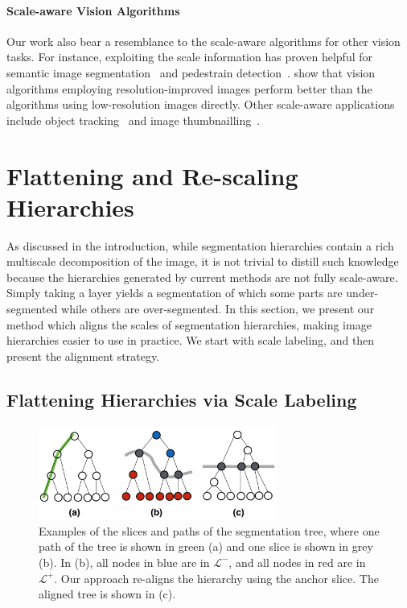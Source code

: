    
\paragraph{Scale-aware Vision Algorithms} 
Our work also bear a resemblance to the scale-aware algorithms for other vision tasks. 
For instance, exploiting the scale information has proven helpful for semantic image segmentation~\citep{chen2015attention, bell15ion} and 
pedestrain detection~\citep{li2015scale}. \citep{SR4VTs:wacv16} show that 
vision algorithms employing resolution-improved images perform better than the algorithms using low-resolution images directly.  
Other scale-aware applications include object tracking~\citep{klodt_etal_2013gcpr} and image thumbnailling~\citep{Sun2013}.     
   
   
   
   
   
\section{Flattening and Re-scaling  Hierarchies}
\label{scale:sec:scaling}
As discussed in the introduction, while segmentation
hierarchies contain a rich multiscale decomposition of the image, it is
not trivial to distill such knowledge because the hierarchies
generated by current methods are not fully scale-aware. Simply taking
a layer yields a segmentation of which some parts are under-segmented
while others are over-segmented. In this section, we present our
method which aligns the scales of segmentation hierarchies, making
image hierarchies easier to use in practice. We start with scale
labeling, and then present the alignment strategy.


\subsection{Flattening Hierarchies via Scale Labeling}
\label{scale:sec:scale:labeling}


\begin{figure}
\begin{center}
\includegraphics[width=0.7\textwidth]{scale-aware/fig/illu.png}
\end{center}
\caption{Examples of the slices and paths of the segmentation tree,
  where one path of the tree is shown in green (a) and one slice is shown
  in grey (b).  In (b), all nodes
  in blue are in $\mathcal{L}^-$, and all nodes in red are in
  $\mathcal{L}^+$. Our approach re-aligns the hierarchy using the
  anchor slice. The aligned tree is shown in (c).}
\label{scale:fig:hier_opt}
\end{figure}


